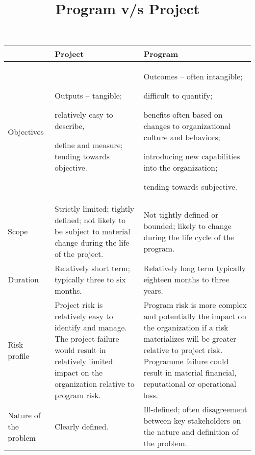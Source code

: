 \documentclass[11pt]{article}
\begin{document}
\begin{large}
\title{Program v/s Project}
\author{}
\date{}
\maketitle
\begin{flushleft}
\begin{tabular}{|p{4cm}|p{6cm}|p{6cm}|}
\hline
	& 	Project	&	Program\\
\hline

Objectives	&	Outputs – tangible; 

relatively easy to describe, 

define and measure; tending towards objective.	

& Outcomes – often  intangible; 

difficult to quantify;

 benefits often based on changes to organizational culture and behaviors;
 
  introducing new capabilities into the organization; 
  
  tending towards subjective. \\

\hline

Scope	& Strictly limited; tightly defined; not likely to be subject to material change during the life of the project.	& Not tightly defined or bounded; likely to change during the life cycle of the program. \\

\hline

Duration	& Relatively short term; typically three to six months.	&Relatively long term typically eighteen months to three years. \\

\hline

Risk profile	& Project risk is relatively easy to identify and manage. The project failure would result in relatively limited impact on the organization relative to program risk.	& Program risk is more complex and potentially the impact on the organization if a risk materializes will be greater relative to project risk. Programme failure could result in material financial, reputational or operational loss.\\

\hline

Nature of the problem	& Clearly defined.	& Ill-defined; often disagreement between key stakeholders on the nature and definition of the problem.\\


\end{tabular}
\end{flushleft}
\end{large}
\end{document}
